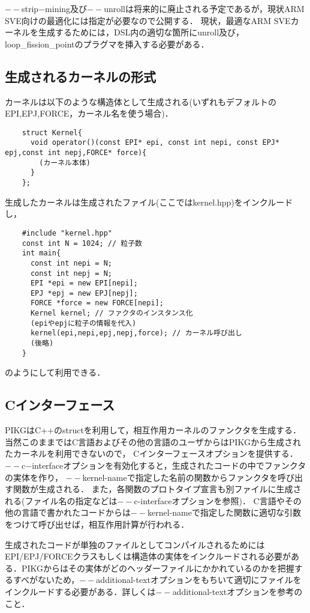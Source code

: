 \documentclass{article}
\begin{document}
  $--$strip$-$mining及び$--$unrollは将来的に廃止される予定であるが，現状ARM SVE向けの最適化には指定が必要なので公開する．
  現状，最適なARM SVEカーネルを生成するためには，DSL内の適切な箇所にunroll及び，loop\_fission\_pointのプラグマを挿入する必要がある．

  \subsection{生成されるカーネルの形式}
  カーネルは以下のような構造体として生成される(いずれもデフォルトのEPI,EPJ,FORCE，カーネル名を使う場合)．
\begin{verbatim}
	struct Kernel{
	  void operator()(const EPI* epi, const int nepi, const EPJ* epj,const int nepj,FORCE* force){
	    (カーネル本体)
	  }
	};
\end{verbatim}
生成したカーネルは生成されたファイル(ここではkernel.hpp)をインクルードし，
\begin{verbatim}
	#include "kernel.hpp"
	const int N = 1024; // 粒子数
	int main{
	  const int nepi = N;
	  const int nepj = N;
	  EPI *epi = new EPI[nepi];
	  EPJ *epj = new EPJ[nepj];
	  FORCE *force = new FORCE[nepi];
	  Kernel kernel; // ファクタのインスタンス化
	  (epiやepjに粒子の情報を代入)
	  kernel(epi,nepi,epj,nepj,force); // カーネル呼び出し
	  (後略)
	}
\end{verbatim}
のようにして利用できる．


\subsection{Cインターフェース}
PIKGはC++のstructを利用して，相互作用カーネルのファンクタを生成する．
当然このままではC言語およびその他の言語のユーザからはPIKGから生成されたカーネルを利用できないので，
Cインターフェースオプションを提供する．
$--$c$-$interfaceオプションを有効化すると，生成されたコードの中でファンクタの実体を作り，
$--$kernel-nameで指定した名前の関数からファンクタを呼び出す関数が生成される．
また，各関数のプロトタイプ宣言も別ファイルに生成される(ファイル名の指定などは$--$c-interfaceオプションを参照)．
C言語やその他の言語で書かれたコードからは$--$kernel-nameで指定した関数に適切な引数をつけて呼び出せば，相互作用計算が行われる．

生成されたコードが単独のファイルとしてコンパイルされるためにはEPI/EPJ/FORCEクラスもしくは構造体の実体をインクルードされる必要がある．PIKGからはその実体がどのヘッダーファイルにかかれているのかを把握するすべがないため，$--$additional-textオプションをもちいて適切にファイルをインクルードする必要がある．詳しくは$--$additional-textオプションを参考のこと．
\end{document}

